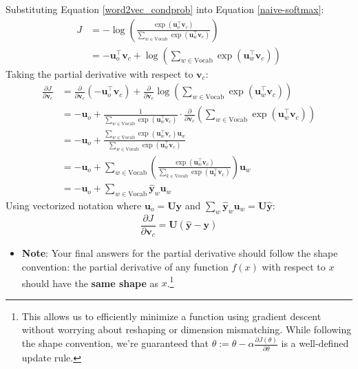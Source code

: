 \begin{parts}
\begin{enumerate}[label=\roman*.]
{        Substituting Equation \ref{word2vec_condprob} into Equation \ref{naive-softmax}:
        \begin{align*}
            J &= -\log \left( \frac{\exp(\mathbf{u}_o^\top \mathbf{v}_c)}{\sum_{w \in \text{Vocab}} \exp(\mathbf{u}_w^\top \mathbf{v}_c)} \right) \\
            &= -\mathbf{u}_o^\top \mathbf{v}_c + \log \left( \sum_{w \in \text{Vocab}} \exp(\mathbf{u}_w^\top \mathbf{v}_c) \right)
        \end{align*}
        Taking the partial derivative with respect to $\mathbf{v}_c$:
        \begin{align*}
            \frac{\partial J}{\partial \mathbf{v}_c} &= \frac{\partial}{\partial \mathbf{v}_c} \left( -\mathbf{u}_o^\top \mathbf{v}_c \right) + \frac{\partial}{\partial \mathbf{v}_c} \log \left( \sum_{w \in \text{Vocab}} \exp(\mathbf{u}_w^\top \mathbf{v}_c) \right) \\
            &= -\mathbf{u}_o + \frac{1}{\sum_{w \in \text{Vocab}} \exp(\mathbf{u}_w^\top \mathbf{v}_c)} \cdot \frac{\partial}{\partial \mathbf{v}_c} \left( \sum_{w \in \text{Vocab}} \exp(\mathbf{u}_w^\top \mathbf{v}_c) \right) \\
            &= -\mathbf{u}_o + \frac{\sum_{w \in \text{Vocab}} \exp(\mathbf{u}_w^\top \mathbf{v}_c) \mathbf{u}_w}{\sum_{w \in \text{Vocab}} \exp(\mathbf{u}_w^\top \mathbf{v}_c)} \\
            &= -\mathbf{u}_o + \sum_{w \in \text{Vocab}} \left( \frac{\exp(\mathbf{u}_w^\top \mathbf{v}_c)}{\sum_{k \in \text{Vocab}} \exp(\mathbf{u}_k^\top \mathbf{v}_c)} \right) \mathbf{u}_w \\
            &= -\mathbf{u}_o + \sum_{w \in \text{Vocab}} \hat{\mathbf{y}}_w \mathbf{u}_w
        \end{align*}
        Using vectorized notation where $\mathbf{u}_o = \mathbf{U}\mathbf{y}$ and $\sum_{w} \hat{\mathbf{y}}_w \mathbf{u}_w = \mathbf{U}\hat{\mathbf{y}}$:
        $$\frac{\partial J}{\partial \mathbf{v}_c} = \mathbf{U}(\hat{\mathbf{y}} - \mathbf{y})$$
    }
    \begin{itemize} 
        \item \textbf{Note}: Your final answers for the partial derivative should follow the shape convention: the partial derivative of any function $f(x)$ with respect to $x$ should have the \textbf{same shape} as $x$.\footnote{This allows us to efficiently minimize a function using gradient descent without worrying about reshaping or dimension mismatching. While following the shape convention, we're guaranteed that $\theta:= \theta - \alpha\frac{\partial J(\theta)}{\partial \theta}$ is a well-defined update rule.}

\end{itemize}
\end{enumerate}
\end{parts}
